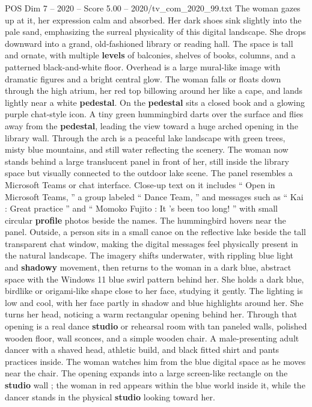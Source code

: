 \begin{textsample}{POS Dim 7 – 2020 – Score 5.00 – 2020/tv\_com\_2020\_99.txt}
The woman gazes up at it, her expression calm and absorbed.
Her dark shoes sink slightly into the pale sand, emphasizing the surreal physicality of this digital landscape.
She drops downward into a grand, old-fashioned library or reading hall.
The space is tall and ornate, with multiple \textbf{levels} of balconies, shelves of books, columns, and a patterned black-and-white floor.
Overhead is a large mural-like image with dramatic figures and a bright central glow.
The woman falls or floats down through the high atrium, her red top billowing around her like a cape, and lands lightly near a white \textbf{pedestal}.
On the \textbf{pedestal} sits a closed book and a glowing purple chat-style icon.
A tiny green hummingbird darts over the surface and flies away from the \textbf{pedestal}, leading the view toward a huge arched opening in the library wall.
Through the arch is a peaceful lake landscape with green trees, misty blue mountains, and still water reflecting the scenery.
The woman now stands behind a large translucent panel in front of her, still inside the library space but visually connected to the outdoor lake scene.
The panel resembles a Microsoft Teams or chat interface.
Close-up text on it includes “ Open in Microsoft Teams, ” a group labeled “ Dance Team, ” and messages such as “ Kai : Great practice ” and “ Momoko Fujito : It ’s been too long! ” with small circular \textbf{profile} photos beside the names.
The hummingbird hovers near the panel.
Outside, a person sits in a small canoe on the reflective lake beside the tall transparent chat window, making the digital messages feel physically present in the natural landscape.
The imagery shifts underwater, with rippling blue light and \textbf{shadowy} movement, then returns to the woman in a dark blue, abstract space with the Windows 11 blue swirl pattern behind her.
She holds a dark blue, birdlike or origami-like shape close to her face, studying it gently.
The lighting is low and cool, with her face partly in shadow and blue highlights around her.
She turns her head, noticing a warm rectangular opening behind her.
Through that opening is a real dance \textbf{studio} or rehearsal room with tan paneled walls, polished wooden floor, wall sconces, and a simple wooden chair.
A male-presenting adult dancer with a shaved head, athletic build, and black fitted shirt and pants practices inside.
The woman watches him from the blue digital space as he moves near the chair.
The opening expands into a large screen-like rectangle on the \textbf{studio} wall ; the woman in red appears within the blue world inside it, while the dancer stands in the physical \textbf{studio} looking toward her.

\end{textsample}
